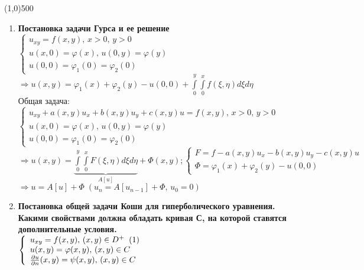 


\fontsize{20}{24}
\line(1,0){500}
\fontsize{12}{15}
\begin{enumerate}
\item \textbf{Постановка задачи Гурса и ее решение}\\
      $\left\{\begin{array}{l}
            u_{xy}=f(x,y),\,x>0,\,y>0\\
            u(x,0)=\varphi(x),\,u(0,y)=\varphi(y)\\
            u(0,0)=\varphi_1(0)=\varphi_2(0)
      \end{array}\right. $\\$\Rightarrow
      u(x,y)=\varphi_1(x)+\varphi_2(y)-u(0,0)+ \int\limits_0^y \int\limits_0^x f(\xi,\eta)d\xi d\eta $\\
      Общая задача: \\
      $\left\{\begin{array}{l}
            u_{xy}+a(x,y)u_x+b(x,y)u_y+c(x,y)u=f(x,y),\,x>0,\,y>0\\
            u(x,0)=\varphi(x),\,u(0,y)=\varphi(y)\\
            u(0,0)=\varphi_1(0)=\varphi_2(0)
      \end{array}\right. $\\$\Rightarrow
      u(x,y)=\underbrace{\int\limits_0^y \int\limits_0^x F(\xi,\eta)d\xi d\eta}_{A\left[u\right]} + \Phi(x,y);
      \left\{\begin{array}{l}
            F = f-a(x,y)u_x-b(x,y)u_y-c(x,y)u\\
            \Phi = \varphi_1(x)+\varphi_2(y)-u(0,0)
      \end{array}\right. $\\$
      \Rightarrow u=A[u]+\Phi\;(u_n=A[u_{n-1}]+\Phi,\,u_0=0) $
\item \textbf{Постановка общей задачи Коши для гиперболического уравнения. Какими свойствами должна обладать кривая С, на которой ставятся дополнительные условия.}\\
      $\left\{\begin{array}{l}
            u_{xy}=f(x,y),\,(x,y)\in D^+ \;\;(1)\\
            u(x,y)=\varphi(x,y),\,(x,y)\in C\\
            \frac{\partial u}{\partial n}(x,y)=\psi(x,y),\,(x,y)\in C
      \end{array}\right. $\\

\end{enumerate}
